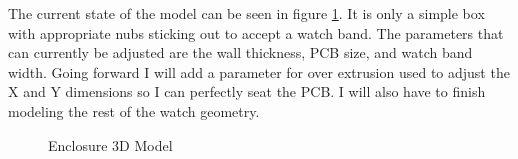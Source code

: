 The current state of the model can be seen in figure \ref{fig:enclosure}.  It
is only a simple box with appropriate nubs sticking out to accept a watch band.
The parameters that can currently be adjusted are the wall thickness, PCB size,
and watch band width.  Going forward I will add a parameter for over extrusion
used to adjust the X and Y dimensions so I can perfectly seat the PCB.  I will
also have to finish modeling the rest of the watch geometry.

\begin{figure}
\centering
{}
\caption{Enclosure 3D Model}
\label{fig:enclosure}
\end{figure}